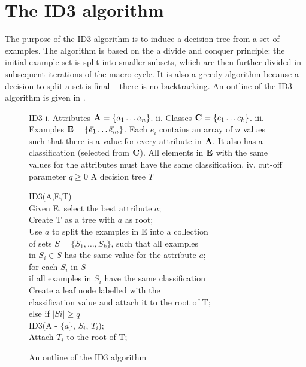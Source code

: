 
\section{The ID3 algorithm}
\label{sec:id3}
The purpose of the ID3 algorithm \cite{quinlan:trees} is to induce a decision tree from a set of examples.  The algorithm is based on the a divide and conquer principle: the initial example set is split into smaller subsets, which are then further divided in subsequent iterations of the macro cycle. It is also a greedy algorithm because a decision to split a set is final -- there is no backtracking.  An outline of the ID3 algorithm is given in .
\begin{figure}[!ht]
\begin{algorithm}
{ID3}
{ i. Attributes ${\bf A} = \{ a_1 \ldots a_n\}$. \newline
	ii. Classes ${\bf C} = \{ c_1 \ldots c_k\}$. \newline
  iii. Examples ${\bf E} = \{\vec e_1 \ldots \vec e_m\}$. Each $e_i$ contains an array of $n$ values such that there is a value for every attribute in ${\bf A}$.  It also has a classification (selected from ${\bf C}$). All elements in ${\bf E}$ with the same values for the attributes must have the same classification.\newline
	iv.  cut-off parameter $q \geq 0$
	}
{A decision tree $T$} 

ID3(A,E,T) \+\\
Given E, select the best attribute $a$; \label{line:id3_select} \\
Create T as a tree with $a$ as root; \\
Use $a$ to split the examples in E  into a collection  \+ \\
	of sets $S = \{S_1, \ldots, S_k\}$, such that all examples \\
	 in $S_i \in S$ has the same value for the attribute $a$; \- \\ 
for each $S_i$ in $S$ \+ \\
	if all examples in $S_i$ have the same classification \+ \\
			Create a leaf node labelled with the  \+ \\ 
			classification value and attach it
			to the root of T; \- \-\\ 
	else  if $|Si| \geq q$ \label{line:id3_prune}\+ \\ 
			ID3(A - $\{a\}$, $S_i$, $T_i$); \\
			Attach $T_i$ to the root of T;
\end{algorithm}
\caption{An outline of the ID3 algorithm}
\label{alg:id3}	
\end{figure}

